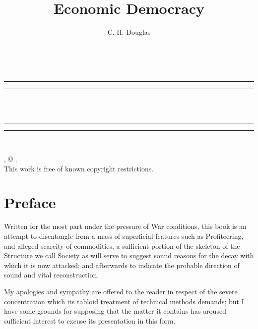 \documentclass{book}
\date{}
\title{Economic Democracy}
\author{C. H. Douglas}
\begin{document}
\thispagestyle{empty}
\begin{center}
	{\Huge \@title   \\[5mm]}
\end{center}
\newpage
\thispagestyle{empty}
\cleardoublepage
\begin{center}
	\thispagestyle{empty}
	\vspace*{\baselineskip}
	\rule{\textwidth}{1.6pt}\vspace*{-\baselineskip}\vspace*{2pt}
	\rule{\textwidth}{0.4pt}\\[\baselineskip]
	{\Huge\scshape \@title   \\[5mm]}
	{\Large }
	\rule{\textwidth}{0.4pt}\vspace*{-\baselineskip}\vspace{3.2pt}
	\rule{\textwidth}{1.6pt}\\[\baselineskip]
	\vspace*{4\baselineskip}
	{\Large \@author}
	\vfill
\end{center}
\pagebreak
\newpage
\thispagestyle{empty}
\null\vfill
\noindent
\begin{center}
	{\emph{\@title}, © \@author.\\[5mm]}
	{This work is free of known copyright restrictions.\\[5mm]}
\end{center}
\pagebreak
\newpage
\setcounter{tocdepth}{0}
\setcounter{secnumdepth}{0}

\chapter*{Preface}
\label{chapter-0}
Written for the most part under the pressure of War conditions, this book is an attempt to disentangle from a mass of superficial features such as Profiteering, and alleged scarcity of commodities, a sufficient portion of the skeleton of the Structure we call Society as will serve to suggest sound reasons for the decay with which it is now attacked; and afterwards to indicate the probable direction of sound and vital reconstruction.

My apologies and sympathy are offered to the reader in respect of the severe concentration which its tabloid treatment of technical methods demands; but I have some grounds for supposing that the matter it contains has aroused sufficient interest to excuse its presentation in this form.
\end{document}
